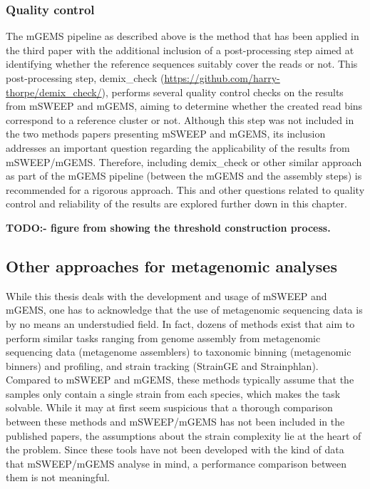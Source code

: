 \documentclass[officiallayout]{tktla}
\begin{document}
\subsubsection{Quality control}

The mGEMS pipeline as described above is the method that has been
applied in the third paper with the additional inclusion of a
post-processing step aimed at identifying whether the reference
sequences suitably cover the reads or not. This post-processing step,
demix\_check (\url{https://github.com/harry-thorpe/demix_check/}),
performs several quality control checks on the results from mSWEEP and
mGEMS, aiming to determine whether the created read bins correspond to
a reference cluster or not. Although this step was not included in the
two methods papers presenting mSWEEP and mGEMS, its inclusion
addresses an important question regarding the applicability of the
results from mSWEEP/mGEMS. Therefore, including demix\_check
\textemdash or other similar approach \textemdash as part of the mGEMS
pipeline (between the mGEMS and the assembly steps) is recommended for
a rigorous approach. This and other questions related to quality
control and reliability of the results are explored further down in
this chapter.

\textbf{TODO:- figure from showing the threshold construction process.}

\subsection{Other approaches for metagenomic analyses}
\label{other-metagenomics-approaches}
While this thesis deals with the development and usage of mSWEEP and
mGEMS, one has to acknowledge that the use of metagenomic sequencing
data is by no means an understudied field. In fact, dozens of methods
exist that aim to perform similar tasks ranging from genome assembly
from metagenomic sequencing data (metagenome assemblers) to taxonomic
binning (metagenomic binners) and profiling, and strain tracking
(StrainGE and Strainphlan). Compared to mSWEEP and mGEMS, these
methods typically assume that the samples only contain a single strain
from each species, which makes the task solvable. While it may at
first seem suspicious that a thorough comparison between these methods
and mSWEEP/mGEMS has not been included in the published papers, the
assumptions about the strain complexity lie at the heart of the
problem. Since these tools have not been developed with the kind of
data that mSWEEP/mGEMS analyse in mind, a performance comparison
between them is not meaningful.
\end{document}
